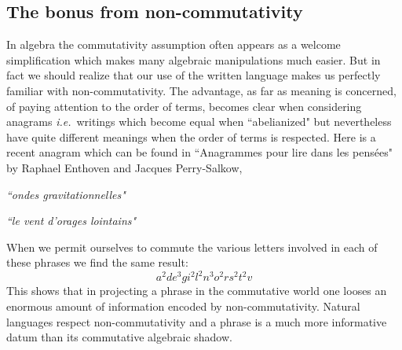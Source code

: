 \documentclass[12pt]{article}
\newcommand{\ie}{{\it i.e.\/}\ }
\begin{document}
\subsection{The  bonus from non-commutativity}\label{ncbonus}

In algebra the commutativity assumption often appears as a welcome simplification 
which makes many algebraic manipulations much easier.  But in fact we should realize that  our use of the written language makes us perfectly familiar with non-commutativity. The advantage, as far as meaning is concerned, of paying attention to the order of terms, becomes clear when considering anagrams \ie writings which become equal when ``abelianized" but nevertheless have quite different meanings when the order of terms is respected. Here is a recent anagram which can be found in ``Anagrammes pour lire dans les pens\' ees" by Raphael Enthoven and Jacques Perry-Salkow,

\vspace{0.8cm}

{\color{blue}

\centerline{\it ``ondes gravitationnelles"}

\vspace{0.4cm}

\centerline {\it``le vent d'orages lointains"}}

\vspace{0.8cm}

When we permit ourselves  to commute the various letters involved in each of these phrases we find the same result:
$$
a^2 d e^3 g i^2 l^2 n^3 o^2 r s^2 t^2 v
$$
This shows that in projecting a phrase in the commutative world one looses an enormous amount of information encoded by non-commutativity. 
Natural languages respect non-commutativity and a phrase is a much more informative datum than its commutative algebraic shadow. 
\end{document}
